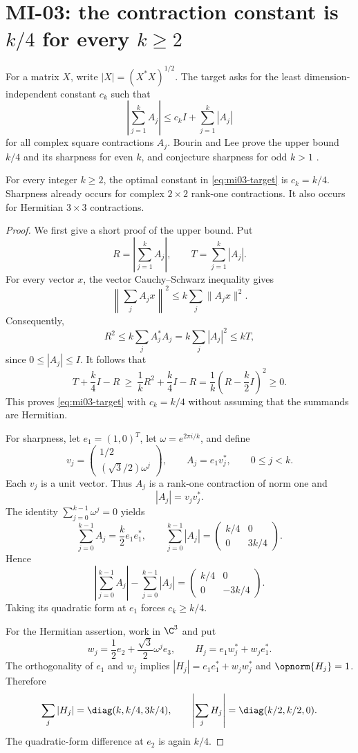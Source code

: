 \section{MI-03: the contraction constant is $k/4$ for every $k\geq2$}
\label{sec:mi03}

For a matrix $X$, write $|X|=(X^*X)^{1/2}$. The target asks for the least dimension-independent constant $c_k$ such that
\begin{equation}\label{eq:mi03-target}
 \left|\sum_{j=1}^k A_j\right|\leq c_k I+\sum_{j=1}^k|A_j|
\end{equation}
for all complex square contractions $A_j$. Bourin and Lee prove the upper bound $k/4$ and its sharpness for even $k$, and conjecture sharpness for odd $k>1$ \cite[Corollary 4.4 and Remark 4.5]{BL2023}.

\begin{theorem}\label{thm:mi03}
For every integer $k\geq2$, the optimal constant in \eqref{eq:mi03-target} is $c_k=k/4$. Sharpness already occurs for complex $2\times2$ rank-one contractions. It also occurs for Hermitian $3\times3$ contractions.
\end{theorem}

\begin{proof}
We first give a short proof of the upper bound. Put
\[
 R=\left|\sum_{j=1}^kA_j\right|,\qquad T=\sum_{j=1}^k|A_j|.
\]
For every vector $x$, the vector Cauchy--Schwarz inequality gives
\[
 \left\|\sum_j A_jx\right\|^2\leq k\sum_j\|A_jx\|^2.
\]
Consequently,
\[
 R^2\leq k\sum_j A_j^*A_j=k\sum_j|A_j|^2\leq kT,
\]
since $0\leq |A_j|\leq I$. It follows that
\[
 T+\frac{k}{4}I-R
 \ \geq\ \frac1kR^2+\frac{k}{4}I-R
 =\frac1k\left(R-\frac{k}{2}I\right)^2\geq0.
\]
This proves \eqref{eq:mi03-target} with $c_k=k/4$ without assuming that the summands are Hermitian.

For sharpness, let $e_1=(1,0)^T$, let $\omega=e^{2\pi i/k}$, and define
\[
 v_j=\begin{pmatrix}1/2\\ (\sqrt3/2)\omega^j\end{pmatrix},
 \qquad A_j=e_1v_j^*,\qquad 0\leq j<k.
\]
Each $v_j$ is a unit vector. Thus $A_j$ is a rank-one contraction of norm one and
\[
 |A_j|=v_jv_j^*.
\]
The identity $\sum_{j=0}^{k-1}\omega^j=0$ yields
\[
 \sum_{j=0}^{k-1} A_j=\frac{k}{2}e_1e_1^*,
 \qquad \sum_{j=0}^{k-1}|A_j|
 =\begin{pmatrix}k/4&0\\0&3k/4\end{pmatrix}.
\]
Hence
\[
 \left|\sum_{j=0}^{k-1} A_j\right|-\sum_{j=0}^{k-1}|A_j|
 =\begin{pmatrix}k/4&0\\0&-3k/4\end{pmatrix}.
\]
Taking its quadratic form at $e_1$ forces $c_k\geq k/4$.

For the Hermitian assertion, work in $\C^3$ and put
\[
 w_j=\frac12e_2+\frac{\sqrt3}{2}\omega^j e_3,
 \qquad H_j=e_1w_j^*+w_je_1^*.
\]
The orthogonality of $e_1$ and $w_j$ implies
$|H_j|=e_1e_1^*+w_jw_j^*$ and $\opnorm{H_j}=1$. Therefore
\[
 \sum_j|H_j|=\diag(k,k/4,3k/4),\qquad
 \left|\sum_jH_j\right|=\diag(k/2,k/2,0).
\]
The quadratic-form difference at $e_2$ is again $k/4$.
\end{proof}

